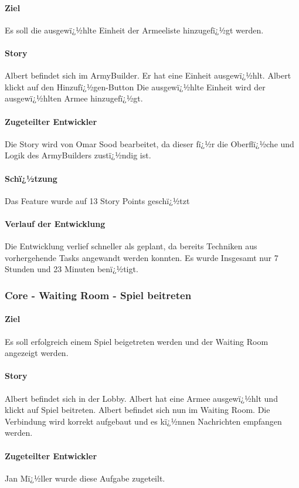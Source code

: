 \documentclass[12pt, titlepage]{scrartcl}
\begin{document}
		\paragraph{Ziel} Es soll die ausgewï¿½hlte Einheit der Armeeliste hinzugefï¿½gt werden.
		\paragraph{Story} Albert befindet sich im ArmyBuilder. Er hat eine Einheit ausgewï¿½hlt. Albert klickt auf den Hinzufï¿½gen-Button Die ausgewï¿½hlte Einheit wird der ausgewï¿½hlten Armee hinzugefï¿½gt.
		\paragraph{Zugeteilter Entwickler} Die Story wird von Omar Sood bearbeitet, da dieser fï¿½r die Oberflï¿½che und Logik des ArmyBuilders zustï¿½ndig ist.
		\paragraph{Schï¿½tzung}
		Das Feature wurde auf 13 Story Points geschï¿½tzt
		\paragraph{Verlauf der Entwicklung} 
		Die Entwicklung verlief schneller als geplant, da bereits Techniken aus vorhergehende Tasks angewandt werden konnten. Es wurde Insgesamt nur 7 Stunden und 23 Minuten benï¿½tigt.
		
		\subsubsection{Core - Waiting Room - Spiel beitreten}
		\paragraph{Ziel} Es soll erfolgreich einem Spiel beigetreten werden und der Waiting Room angezeigt werden.
		\paragraph{Story} Albert befindet sich in der Lobby. Albert hat eine Armee ausgewï¿½hlt und klickt auf Spiel beitreten. Albert befindet sich nun im Waiting Room. Die Verbindung wird korrekt aufgebaut und es kï¿½nnen Nachrichten empfangen werden.
		\paragraph{Zugeteilter Entwickler} Jan Mï¿½ller wurde diese Aufgabe zugeteilt.
\end{document}
